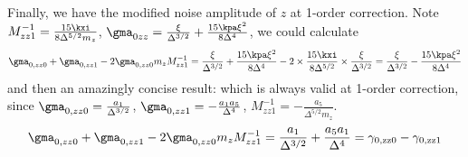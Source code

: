 Finally, we have the modified noise amplitude of $z$ at 1-order correction. 
Note $M^{-1}_{zz1} = \frac{15\kxi}{8 \Delta^{5/2} m_z}$, $\gma_{0zz} = \frac{\xi}{\Delta^{3/2}} + \frac{15 \kpa \xi^2}{8 \Delta^4}$, we could calculate
$$ \gma_{0,zz0} + \gma_{0,zz1} - 2\gma_{0,zz0} m_z M^{-1}_{zz1} = \frac{\xi}{\Delta^{3/2}} + \frac{15 \kpa \xi^2}{8 \Delta^4} - 2 \times \frac{15\kxi}{8 \Delta^{5/2}} \times \frac{\xi}{\Delta^{3/2}} = \frac{\xi}{\Delta^{3/2}} - \frac{15 \kpa \xi^2}{8 \Delta^4} $$
and then an amazingly concise result:
which is always valid at 1-order correction, since $\gma_{0,zz0} = \frac{a_1}{\Delta^{3/2}}$, $\gma_{0,zz1} = - \frac{a_1 a_5}{\Delta^4}$, $M^{-1}_{zz1} = - \frac{a_5}{\Delta^{5/2} m_z}$.
$$ \gma_{0,zz0} + \gma_{0,zz1} - 2\gma_{0,zz0} m_z M^{-1}_{zz1} = \frac{a_1}{\Delta ^{3/2}}+\frac{a_5 a_1}{\Delta ^4} = \gamma _{0,\text{zz0}}-\gamma _{0,\text{zz1}} $$

